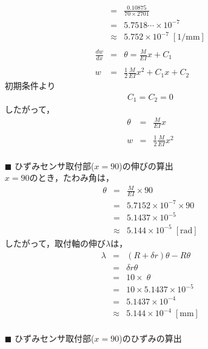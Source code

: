 \documentclass[twocolumn,a4j]{jsarticle}
\begin{document}
\begin{itemize}
\begin{eqnarray*}
              &=&\frac{0.10875}{70 × 2701}\\
              &=&5.7518 \cdots × 10^{-7}\\
              &\approx& 5.752 × 10^{-7} \;\left[\mathrm{1/mm}\right]\\ \\
              \frac{dw}{dx} &=& \theta = \frac{M}{EI} x + C_1\\ \\
              w &=& \frac{1}{2} \frac{M}{EI} x^2 + C_1x + C_2
          \end{eqnarray*}
          初期条件より
          \begin{eqnarray*}
              C_1 = C_2 = 0
          \end{eqnarray*}
          したがって，
          \begin{eqnarray*}
              \theta &=& \frac{M}{EI}x\\ \\
              w &=& \frac{1}{2}\frac{M}{EI}x^2\\
          \end{eqnarray*}
    \item [$\blacksquare$] ひずみセンサ取付部($x=90$)の伸びの算出\\
          $x = 90$のとき，たわみ角は，
          \begin{eqnarray*}
              \theta &=& \frac{M}{EI} × 90\\
              &=& 5.7152 × 10^{-7} × 90\\
              &=& 5.1437 × 10^{-5}\\
              &\approx& 5.144 × 10^{-5} \;\left[\mathrm{rad}\right]
          \end{eqnarray*}
          したがって，取付軸の伸び$\lambda$は，
          \begin{eqnarray*}
              \lambda &=& \left(R+\delta r\right)\theta - R\theta\\
              &=& \delta r \theta\\
              &=& 10 × \;\theta\\
              &=& 10 × 5.1437 × 10^{-5}\\
              &=& 5.1437 × 10^{-4}\\
              &\approx& 5.144 × 10^{-4} \;\left[\mathrm{mm}\right]\\
          \end{eqnarray*}
    \item [$\blacksquare$] ひずみセンサ取付部($x=90$)のひずみの算出

\end{itemize}
\end{document}
